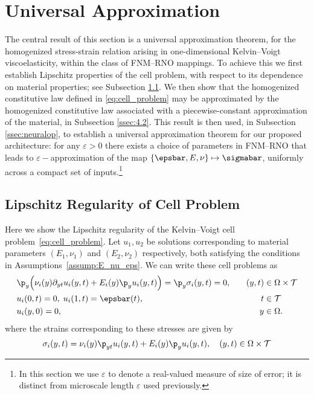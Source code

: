 \documentclass[letterpaper,11pt]{article}
\begin{document}
\section{Universal Approximation}
\label{sec:A}
The central result of this section is a universal approximation theorem, for the homogenized stress-strain relation arising in one-dimensional Kelvin--Voigt viscoelasticity, within the class of FNM--RNO mappings. To achieve this we first establish Lipschitz properties of the 
cell problem, with respect to its dependence on material properties; see Subsection \ref{ssec:C}. We then show that the homogenized constitutive law defined in \eqref{eq:cell_problem} may be approximated by the homogenized constitutive law associated with a piecewise-constant approximation of the material, in Subsection \ref{ssec:4.2}. This result is then used, in Subsection \ref{ssec:neuralop}, to establish a universal approximation theorem for our proposed architecture: for any $\varepsilon>0$ there exists a choice of parameters in FNM--RNO that leads to $\varepsilon-$approximation of the map $\{\epsbar, E, \nu\} \mapsto \sigmabar$, uniformly across a compact set of inputs.\footnote{In this section we use $\varepsilon$ to denote a real-valued measure of size of error; it is distinct from microscale length $\varepsilon$ used previously.}


\subsection{Lipschitz Regularity of Cell Problem}
\label{ssec:C}
Here we show the Lipschitz regularity of the Kelvin--Voigt cell problem~\eqref{eq:cell_problem}. Let $u_1, u_2$ be solutions corresponding to material parameters $(E_1, \nu_1)$ and $(E_2, \nu_2)$ respectively, both satisfying the conditions in Assumptions~\ref{assump:E_nu_eps}. We can write these cell problems as
\begin{subequations}\label{eq:cell_problem_i}
\begin{align}
     &\p_y\Big(\nu_i(y)\partial_{yt}u_i(y, t) + E_i(y)\p_y u_i(y, t)\Big) = \p_y\sigma_i(y, t) = 0, &\quad (y,t) &\in \Omega \times \mathcal{T} \label{subeq:map_i}\\
    &u_i(0, t) = 0, \; u_i(1, t) = \epsbar(t), &\; t &\in \mathcal{T} \\
    &u_i(y, 0) = 0, &\; y&\in \Omega.
\end{align}
\end{subequations}
where the strains corresponding to these stresses are given by
\begin{equation}\label{eq:stress_i}
    \sigma_i(y, t) = \nu_i(y)\p_{yt}u_i(y, t) + E_i(y)\p_y u_i(y, t), \quad (y,t) \in \Omega \times \mathcal{T}
\end{equation}
\end{document}
